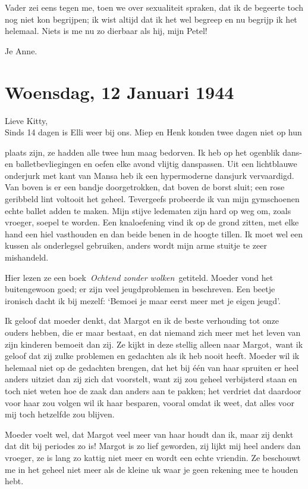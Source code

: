 \documentclass{book}
\begin{document}
Vader zei eens tegen me, toen we over sexualiteit spraken, dat ik de
begeerte toch nog niet kon begrijpen; ik wist altijd dat ik het wel
begreep en nu begrijp ik het helemaal. Niets is me nu zo dierbaar als
hij, mijn Petel!

Je Anne.

\chapter{Woensdag, 12 Januari 1944}

Lieve Kitty,\\Sinds 14 dagen is Elli weer bij ons. Miep en Henk konden
twee dagen niet op hun

plaats zijn, ze hadden alle twee hun maag bedorven. Ik heb op het
ogenblik dans- en balletbevliegingen en oefen elke avond vlijtig
danspassen. Uit een lichtblauwe onderjurk met kant van Mansa heb ik een
hypermoderne dansjurk vervaardigd. Van boven is er een bandje
doorgetrokken, dat boven de borst sluit; een rose geribbeld lint
voltooit het geheel. Tevergeefs probeerde ik van mijn gymschoenen echte
ballet adden te maken. Mijn stijve ledematen zijn hard op weg om, zoals
vroeger, soepel te worden. Een knaloefening vind ik op de grond zitten,
met elke hand een hiel vasthouden en dan beide benen in de hoogte
tillen. Ik moet wel een kussen als onderlegsel gebruiken, anders wordt
mijn arme stuitje te zeer mishandeld.

Hier lezen ze een boek~\emph{Ochtend zonder wolken}~getiteld. Moeder
vond het buitengewoon goed; er zijn veel jeugdproblemen in beschreven.
Een beetje ironisch dacht ik bij mezelf: `Bemoei je maar eerst meer met
je eigen jeugd'.

Ik geloof dat moeder denkt, dat Margot en ik de beste verhouding tot
onze ouders hebben, die er maar bestaat, en dat niemand zich meer met
het leven van zijn kinderen bemoeit dan zij. Ze kijkt in deze stellig
alleen naar Margot,~want ik geloof dat zij zulke problemen en gedachten
als ik heb nooit heeft. Moeder wil ik helemaal niet op de gedachten
brengen, dat het bij één van haar spruiten er heel anders uitziet dan
zij zich dat voorstelt, want zij zou geheel verbijsterd staan en toch
niet weten hoe de zaak dan anders aan te pakken; het verdriet dat
daardoor voor haar zou volgen wil ik haar besparen, vooral omdat ik
weet, dat alles voor mij toch hetzelfde zou blijven.

Moeder voelt wel, dat Margot veel meer van haar houdt dan ik, maar zij
denkt dat dit bij periodes zo is! Margot is zo lief geworden, zij lijkt
mij heel anders dan vroeger, ze is lang zo kattig niet meer en wordt een
echte vriendin. Ze beschouwt me in het geheel niet meer als de kleine uk
waar je geen rekening mee te houden hebt.
\end{document}
